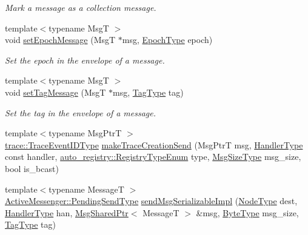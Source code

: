 \begin{DoxyCompactItemize}
\begin{DoxyCompactList}\small\item\em Mark a message as a collection message. \end{DoxyCompactList}\item 
{\footnotesize template$<$typename MsgT $>$ }\\void \hyperlink{structvt_1_1messaging_1_1_active_messenger_a5fc9cb79e5cbef41007d847964c17113}{set\+Epoch\+Message} (MsgT $\ast$msg, \hyperlink{namespacevt_a985a5adf291c34a3ca263b3378388236}{Epoch\+Type} epoch)
\begin{DoxyCompactList}\small\item\em Set the epoch in the envelope of a message. \end{DoxyCompactList}\item 
{\footnotesize template$<$typename MsgT $>$ }\\void \hyperlink{structvt_1_1messaging_1_1_active_messenger_ab6d3637cb3c416b3491b748aaf4bab48}{set\+Tag\+Message} (MsgT $\ast$msg, \hyperlink{namespacevt_a84ab281dae04a52a4b243d6bf62d0e52}{Tag\+Type} tag)
\begin{DoxyCompactList}\small\item\em Set the tag in the envelope of a message. \end{DoxyCompactList}\item 
{\footnotesize template$<$typename Msg\+PtrT $>$ }\\\hyperlink{namespacevt_1_1trace_a64a7185f3e102df8d8258f263ccd1582}{trace\+::\+Trace\+Event\+I\+D\+Type} \hyperlink{structvt_1_1messaging_1_1_active_messenger_a527858e860bb7b373489ae425fd3fdcc}{make\+Trace\+Creation\+Send} (Msg\+PtrT msg, \hyperlink{namespacevt_af64846b57dfcaf104da3ef6967917573}{Handler\+Type} const handler, \hyperlink{namespacevt_1_1auto__registry_a9f369ca2b484130b396729e2ddf05241}{auto\+\_\+registry\+::\+Registry\+Type\+Enum} type, \hyperlink{namespacevt_abfa009d900299ac1df967b40ea8f2c8a}{Msg\+Size\+Type} msg\+\_\+size, bool is\+\_\+bcast)
\item 
{\footnotesize template$<$typename MessageT $>$ }\\\hyperlink{structvt_1_1messaging_1_1_active_messenger_a3626a6ca76d8ad4ec7c3b47a2c70d3a8}{Active\+Messenger\+::\+Pending\+Send\+Type} \hyperlink{structvt_1_1messaging_1_1_active_messenger_aa4c842c0d4ae6c277201aef4da383456}{send\+Msg\+Serializable\+Impl} (\hyperlink{namespacevt_a866da9d0efc19c0a1ce79e9e492f47e2}{Node\+Type} dest, \hyperlink{namespacevt_af64846b57dfcaf104da3ef6967917573}{Handler\+Type} han, \hyperlink{structvt_1_1messaging_1_1_msg_shared_ptr}{Msg\+Shared\+Ptr}$<$ MessageT $>$ \&msg, \hyperlink{namespacevt_aab8d55968084610ce3b17057981e9300}{Byte\+Type} msg\+\_\+size, \hyperlink{namespacevt_a84ab281dae04a52a4b243d6bf62d0e52}{Tag\+Type} tag)

\end{DoxyCompactItemize}
